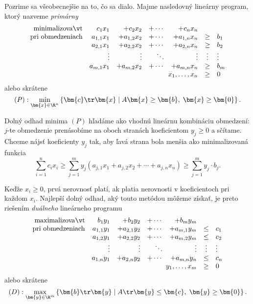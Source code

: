 \noindent
Pozrime sa všeobecnejšie na to, čo sa dialo. Majme nasledovný lineárny program, ktorý nazveme {\em primárny}
$$
\begin{array}{rrrrrcl}
  {\rm minimalizovať}     & c_1x_1     & + c_2x_2       & + \cdots  & +c_nx_n  \\
  {\rm pri\ obmedzeniach} & a_{1,1}x_1 & + a_{1,2}x_2   & + \cdots  & +a_{1,n}x_n  & \ge & b_1 \\
                          & a_{2,1}x_1 & + a_{2,2}x_2   & + \cdots  & +a_{2,n}x_n  & \ge & b_2 \\
                          &   \vdots   &   \vdots       &   \ddots   &  \vdots      &  \vdots & \vdots\\ 
                          & a_{m,1}x_1 & + a_{m,2}x_2   & + \cdots  & +a_{m,n}x_n  & \ge & b_m \\
                          &\multicolumn{4}{r}{x_1,\ldots,x_n}&\ge&0
\end{array}
$$
alebo skrátene
$$ (P): \min_{\bm{x}\in\R^n}\left\{ \bm{c}\tr\bm{x} \mid A\bm{x}\ge\bm{b},\;\bm{x}\ge\bm{0}\right\}.$$

\noindent
Dolný odhad minima $(P)$ hľadáme ako vhodnú lineárnu kombináciu obmedzení: $j$-te obmedzenie 
prenásobíme na oboch stranách koeficientom $y_j\ge 0$ a sčítame.
Chceme nájsť koeficienty $y_j$ tak, aby ľavá strana bola menšia ako minimalizovaná funkcia 
$$ \sum\limits_{i=1}^nc_ix_i\ge \sum\limits_{j=1}^m y_j 
\left(a_{j,1}x_1 + a_{j,2}x_2 + \cdots + a_{j,n}x_n\right) \ge  \sum\limits_{j=1}^my_j\cdot b_j. $$

Keďže $x_i\ge0$, prvá nerovnosť platí, ak platia nerovnosti v koeficientoch pri každom $x_i$. Najlepší
dolný odhad, aký touto metódou môžeme získať, je preto riešením
{\em duálneho} lineárneho programu
$$
\begin{array}{rrrrrcl}
  {\rm maximalizovať}     & b_1y_1     & + b_2y_2       & + \cdots  & +b_my_m  \\
  {\rm pri\ obmedzeniach} & a_{1,1}y_1 & + a_{2,1}y_2   & + \cdots  & +a_{m,1}y_m  & \le & c_1 \\
                          & a_{1,2}y_1 & + a_{2,2}y_2   & + \cdots  & +a_{m,2}y_m  & \le & c_2 \\
                          &   \vdots   &   \vdots       &   \ddots   &  \vdots      &  \vdots & \vdots\\ 
                          & a_{1,n}y_1 & + a_{2,n}y_2   & + \cdots  & +a_{m,n}y_n  & \le & c_n \\
                          &\multicolumn{4}{r}{y_1,\ldots,x_m}&\ge&0
\end{array}
$$
alebo skrátene
$$ (D): \max_{\bm{y}\in\R^m}\left\{ \bm{b}\tr\bm{y} \mid A\tr\bm{y}\le\bm{c},\;\bm{y}\ge\bm{0}\right\}.$$

